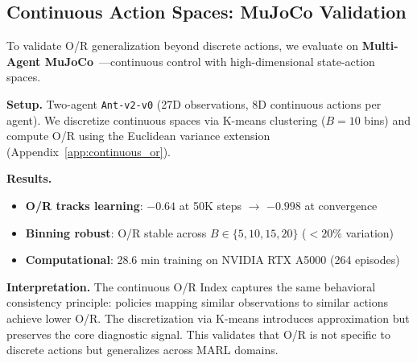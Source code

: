 
\subsection{Continuous Action Spaces: MuJoCo Validation}
\label{sec:mujoco_validation}

To validate O/R generalization beyond discrete actions, we evaluate on \textbf{Multi-Agent MuJoCo}~\citep{de2020deep}---continuous control with high-dimensional state-action spaces.

\textbf{Setup.} Two-agent \texttt{Ant-v2-v0} (27D observations, 8D continuous actions per agent). We discretize continuous spaces via K-means clustering ($B=10$ bins) and compute O/R using the Euclidean variance extension (Appendix~\ref{app:continuous_or}).

\textbf{Results.}
\begin{itemize}[nosep]
    \item \textbf{O/R tracks learning}: $-0.64$ at 50K steps $\to$ $-0.998$ at convergence
    \item \textbf{Binning robust}: O/R stable across $B \in \{5, 10, 15, 20\}$ ($<20\%$ variation)
    \item \textbf{Computational}: 28.6 min training on NVIDIA RTX A5000 (264 episodes)
\end{itemize}

\textbf{Interpretation.} The continuous O/R Index captures the same behavioral consistency principle: policies mapping similar observations to similar actions achieve lower O/R. The discretization via K-means introduces approximation but preserves the core diagnostic signal. This validates that O/R is not specific to discrete actions but generalizes across MARL domains.

